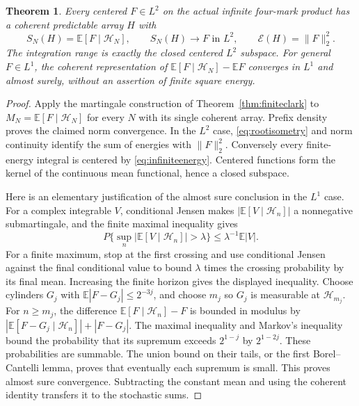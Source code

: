 \documentclass[11pt]{article}
\newtheorem{theorem}{Theorem}[section]
\newcommand{\E}{\mathbb E}\newcommand{\Pp}{\mathbb P}
\begin{document}
\begin{theorem}\label{thm:infiniteclark}
Every centered $F\in L^2$ on the actual infinite four-mark product
has a coherent predictable array $H$ with
\[
 S_N(H)=\E[F\mid\mathcal H_N],\qquad
 S_N(H)\longrightarrow F\text{ in }L^2,\qquad
 \mathcal E(H)=\|F\|_2^2.
\]
The integration range is exactly the closed centered $L^2$ subspace.
For general $F\in L^1$, the coherent representation of
$\E[F\mid\mathcal H_N]-\E F$ converges in $L^1$ and almost surely,
without an assertion of finite square energy.
\end{theorem}
\begin{proof}
Apply the martingale construction of Theorem~\ref{thm:finiteclark} to
$M_N=\E[F\mid\mathcal H_N]$ for every $N$ with its single coherent
array. Prefix density proves the claimed norm convergence. In the
$L^2$ case, \eqref{eq:rootisometry} and norm continuity identify the
sum of energies with $\|F\|_2^2$. Conversely every finite-energy integral
is centered by \eqref{eq:infiniteenergy}. Centered functions form the
kernel of the continuous mean functional, hence a closed subspace.

Here is an elementary justification of the almost sure conclusion in
the $L^1$ case. For a complex integrable $V$, conditional Jensen makes
$|\E[V\mid\mathcal H_n]|$ a nonnegative submartingale, and the finite
maximal inequality gives
\[
 P\{\sup_n|\E[V\mid\mathcal H_n]|>\lambda\}
 \le\lambda^{-1}\E|V|.
\]
For a finite maximum, stop at the first crossing and use conditional
Jensen against the final conditional value to bound $\lambda$ times
the crossing probability by its final mean. Increasing the finite
horizon gives the displayed inequality. Choose cylinders $G_j$ with
$\E|F-G_j|\le2^{-3j}$, and choose $m_j$ so $G_j$ is measurable at
$\mathcal H_{m_j}$. For $n\ge m_j$, the difference
$\E[F\mid\mathcal H_n]-F$ is bounded in modulus by
$|\E[F-G_j\mid\mathcal H_n]|+|F-G_j|$.
The maximal inequality and Markov's inequality bound the probability
that its supremum exceeds $2^{1-j}$ by $2^{1-2j}$. These probabilities
are summable. The union bound on their tails, or the first
Borel--Cantelli lemma, proves that eventually each supremum is small.
This proves almost sure convergence. Subtracting the constant mean
and using the coherent identity transfers it to the stochastic sums.
\end{proof}
\end{document}
